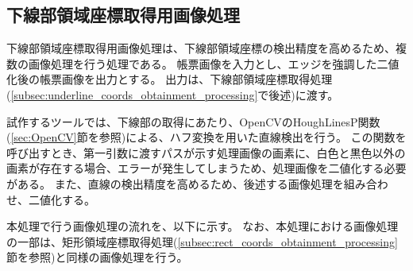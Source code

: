 \subsection{下線部領域座標取得用画像処理}\label{subsec:image_processing_for_underline_coords_obtainment}
下線部領域座標取得用画像処理は、下線部領域座標の検出精度を高めるため、複数の画像処理を行う処理である。
帳票画像を入力とし、エッジを強調した二値化後の帳票画像を出力とする。
出力は、下線部領域座標取得処理(\ref{subsec:underline_coords_obtainment_processing}で後述)に渡す。

試作するツールでは、下線部の取得にあたり、OpenCVのHoughLinesP関数(\ref{sec:OpenCV}節を参照)による、ハフ変換を用いた直線検出を行う。
この関数を呼び出すとき、第一引数に渡すパスが示す処理画像の画素に、白色と黒色以外の画素が存在する場合、エラーが発生してしまうため、処理画像を二値化する必要がある。
また、直線の検出精度を高めるため、後述する画像処理を組み合わせ、二値化する。

本処理で行う画像処理の流れを、以下に示す。
なお、本処理における画像処理の一部は、矩形領域座標取得処理(\ref{subsec:rect_coords_obtainment_processing}節を参照)と同様の画像処理を行う。

